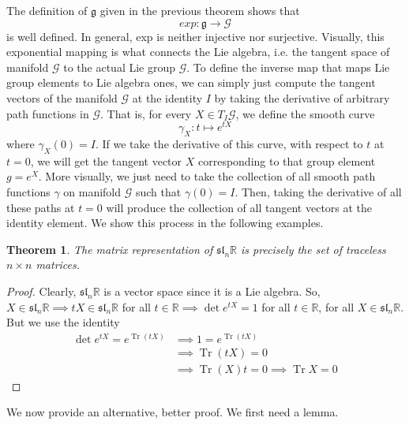 \documentclass{article}
\DeclareMathOperator{\Tr}{Tr}
\newtheorem{theorem}{Theorem}[section]
\theoremstyle{remark}
\theoremstyle{definition}
\begin{document}
The definition of $\mathfrak{g}$ given in the previous theorem shows that 
\[exp: \mathfrak{g} \longrightarrow \mathcal{G}\]
is well defined. In general, exp is neither injective nor surjective. Visually, this exponential mapping is what connects the Lie algebra, i.e. the tangent space of manifold $\mathcal{G}$ to the actual Lie group $\mathcal{G}$. To define the inverse map that maps Lie group elements to Lie algebra ones, we can simply just compute the tangent vectors of the manifold $\mathcal{G}$ at the identity $I$ by taking the derivative of arbitrary path functions in $\mathcal{G}$. That is, for every $X \in T_I \mathcal{G}$, we define the smooth curve 
\[\gamma_X: t \mapsto e^{tX}\]
where $\gamma_X(0) = I$. If we take the derivative of this curve, with respect to $t$ at $t = 0$, we will get the tangent vector $X$ corresponding to that group element $g = e^{X}$. More visually, we just need to take the collection of all smooth path functions $\gamma$ on manifold $\mathcal{G}$ such that $\gamma(0) = I$. Then, taking the derivative of all these paths at $t = 0$ will produce the collection of all tangent vectors at the identity element. We show this process in the following examples. 
\begin{theorem}
The matrix representation of $\mathfrak{sl}_n \mathbb{R}$ is precisely the set of traceless $n \times n$ matrices. 
\end{theorem}
\begin{proof}
Clearly, $\mathfrak{sl}_n \mathbb{R}$ is a vector space since it is a Lie algebra. So, $X \in \mathfrak{sl}_n \mathbb{R} \implies t X \in \mathfrak{sl}_n \mathbb{R}$ for all $t \in \mathbb{R} \implies \det{e^{tX}} = 1$ for all $t \in \mathbb{R}$, for all $X \in \mathfrak{sl}_n \mathbb{R}$. But we use the identity 
\begin{align*}
    \det{e^{tX}} = e^{\Tr{(tX)}} & \implies 1 = e^{\Tr{(t X)}} \\
    & \implies \Tr{(tX)} = 0 \\
    & \implies \Tr{(X)} t = 0 \implies \Tr{X} = 0
\end{align*}
\end{proof}
We now provide an alternative, better proof. We first need a lemma. 
\end{document}
